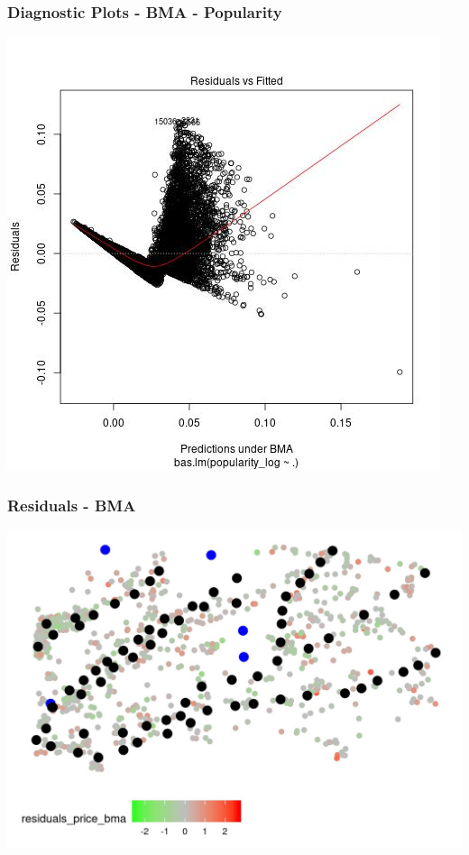 \documentclass{beamer}
\begin{document}
\begin{frame}
\frametitle{Diagnostic Plots - BMA - Popularity}
\begin{center}
	\includegraphics[scale = 0.5]{diagnostics_pop_bma.jpeg}	
\end{center}
\end{frame}



\begin{frame}
\frametitle{Residuals - BMA}
\includegraphics[scale = 0.9]{map_price_bma.jpeg}
\end{frame} 
\end{document}
